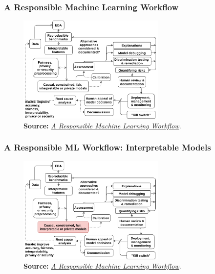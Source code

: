 \documentclass[11pt,aspectratio=169,hyperref={colorlinks}]{beamer}
\begin{document}
		\begin{frame}
		
			\frametitle{A Responsible Machine Learning Workflow}
			
			\begin{figure}[htb]
				\begin{center}
					\includegraphics[height=150pt]{../img/rml_diagram_no_hilite.png}\\\vspace{5pt}
					\label{fig:blueprint_nohl}
					\scriptsize{\textbf{Source:} \href{https://www.mdpi.com/2078-2489/11/3/137/htm}{\textit{A Responsible Machine Learning Workflow}}.}
				\end{center}
			\end{figure}
		
		\end{frame}
		
		\begin{frame}
	
			\frametitle{A Responsible ML Workflow: Interpretable Models}		
			
			\begin{figure}[htb]
				\begin{center}
					\includegraphics[height=150pt]{../img/rml_diagram_lec1_hilite.png}\\\vspace{5pt}
					\label{fig:blueprint_l1hl}
					\scriptsize{\textbf{Source:} \href{https://www.mdpi.com/2078-2489/11/3/137/htm}{\textit{A Responsible Machine Learning Workflow}}.}
				\end{center}
			\end{figure}		
					
		\end{frame}					
\end{document}

